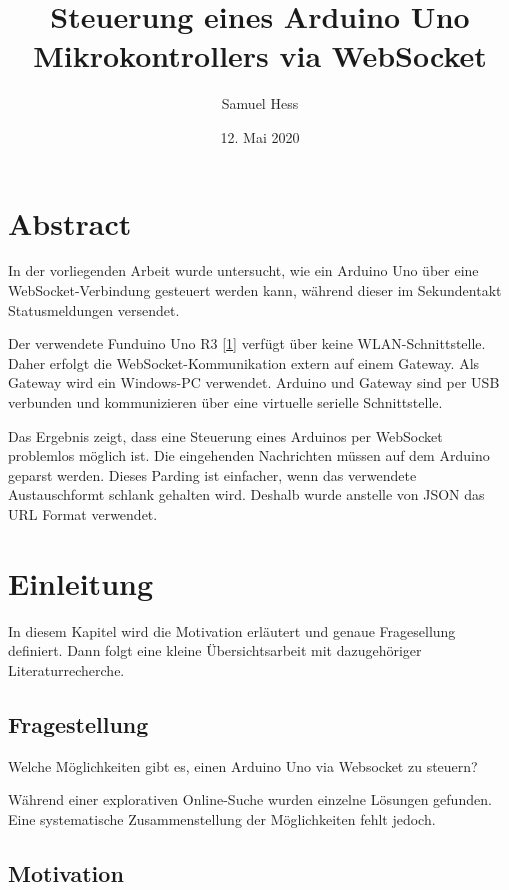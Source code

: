 \documentclass[
  ngerman,
  a4paper,
  12pt]{scrartcl}
\title{Steuerung eines Arduino Uno Mikrokontrollers via WebSocket}
\author{Samuel Hess}
\date{12. Mai 2020}
\begin{document}
\maketitle

\renewcommand*\contentsname{Inhaltsverzeichnis}
{
\hypersetup{linkcolor=}
\setcounter{tocdepth}{2}
\tableofcontents
}
\hypertarget{abstract}{%
\section{Abstract}\label{abstract}}

In der vorliegenden Arbeit wurde untersucht, wie ein Arduino Uno über
eine WebSocket-Verbindung gesteuert werden kann, während dieser im
Sekundentakt Statusmeldungen versendet.

Der verwendete Funduino Uno R3 {[}\protect\hyperlink{ref-lernset}{1}{]}
verfügt über keine WLAN-Schnittstelle. Daher erfolgt die
WebSocket-Kommunikation extern auf einem Gateway. Als Gateway wird ein
Windows-PC verwendet. Arduino und Gateway sind per USB verbunden und
kommunizieren über eine virtuelle serielle Schnittstelle.

Das Ergebnis zeigt, dass eine Steuerung eines Arduinos per WebSocket
problemlos möglich ist. Die eingehenden Nachrichten müssen auf dem
Arduino geparst werden. Dieses Parding ist einfacher, wenn das
verwendete Austauschformt schlank gehalten wird. Deshalb wurde anstelle
von JSON das URL Format verwendet.

\hypertarget{einleitung}{%
\section{Einleitung}\label{einleitung}}

In diesem Kapitel wird die Motivation erläutert und genaue Fragesellung
definiert. Dann folgt eine kleine Übersichtsarbeit mit dazugehöriger
Literaturrecherche.

\hypertarget{fragestellung}{%
\subsection{Fragestellung}\label{fragestellung}}

Welche Möglichkeiten gibt es, einen Arduino Uno via Websocket zu
steuern?

Während einer explorativen Online-Suche wurden einzelne Lösungen
gefunden. Eine systematische Zusammenstellung der Möglichkeiten fehlt
jedoch.

\hypertarget{motivation}{%
\subsection{Motivation}\label{motivation}}
\end{document}

